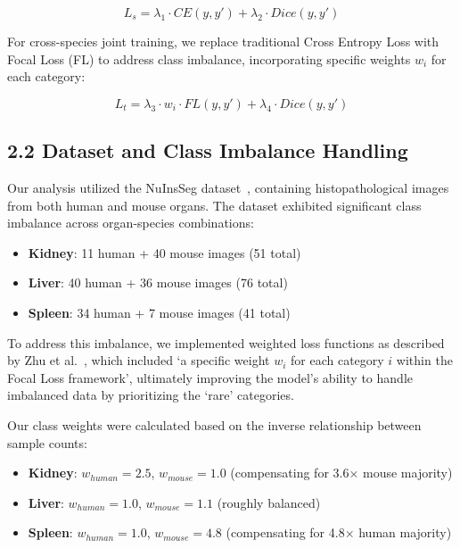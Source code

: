 \documentclass[11pt]{article}
\begin{document}
\begin{equation}
L_s = \lambda_1 \cdot CE(y, y') + \lambda_2 \cdot Dice(y, y')
\end{equation}


\noindent
For cross-species joint training, we replace traditional Cross Entropy Loss with Focal Loss (FL) to address class imbalance, incorporating specific weights $w_i$ for each category:

\begin{equation}
L_t = \lambda_3 \cdot w_i \cdot FL(y, y') + \lambda_4 \cdot Dice(y, y')
\end{equation}

\subsection*{2.2 Dataset and Class Imbalance Handling}
\noindent
Our analysis utilized the NuInsSeg dataset~\cite{Mahbod2024}, containing histopathological images from both human and mouse organs. The dataset exhibited significant class imbalance across organ-species combinations:

\begin{itemize}
\item \textbf{Kidney}: 11 human + 40 mouse images (51 total)
\item \textbf{Liver}: 40 human + 36 mouse images (76 total)  
\item \textbf{Spleen}: 34 human + 7 mouse images (41 total)
\end{itemize}

To address this imbalance, we implemented weighted loss functions as described by Zhu et al.~\cite{zhu2025crossspeciesdataintegrationenhanced}, which included `a specific weight $w_i$ for each category $i$ within the Focal Loss framework', ultimately improving the model's ability to handle imbalanced data by prioritizing the `rare' categories.

Our class weights were calculated based on the inverse relationship between sample counts:

\begin{itemize}
\item \textbf{Kidney}: $w_{human} = 2.5$, $w_{mouse} = 1.0$ (compensating for 3.6× mouse majority)
\item \textbf{Liver}: $w_{human} = 1.0$, $w_{mouse} = 1.1$ (roughly balanced)
\item \textbf{Spleen}: $w_{human} = 1.0$, $w_{mouse} = 4.8$ (compensating for 4.8× human majority)
\end{itemize}
\end{document}
